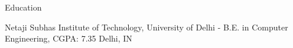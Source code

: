 \documentclass[../resume.tex]{subfiles}
\begin{document}
\begin{rSection}{ Education }

\rSubsectionHeading
    {Netaji Subhas Institute of Technology, \nem University of Delhi}
    {  -  }
    {\normalfont B.E. in Computer Engineering, CGPA: 7.35}
    {Delhi, IN}


\end{rSection}
\end{document}
